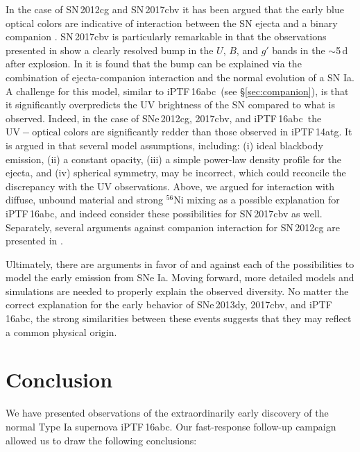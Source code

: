 \documentclass[twocolumn]{aastex61}
\newcommand{\abc}{iPTF\,16abc}
\begin{document}
In the case of SN\,2012cg and SN\,2017cbv it has been argued that the early
blue optical colors are indicative of interaction between the SN ejecta and a
binary companion \citep{2016ApJ...820...92M,2017ApJ...845L..11H}. SN\,2017cbv
is particularly remarkable in that the observations presented in
\citet{2017ApJ...845L..11H} show a clearly resolved bump in the $U$, $B$, and
$g'$ bands in the $\sim$5\,d after explosion. In
\citeauthor{2017ApJ...845L..11H} it is found that the bump can be explained
via the combination of ejecta-companion interaction and the normal evolution
of a SN Ia. A challenge for this model, similar to \abc\ (see
\S\ref{sec:companion}), is that it significantly overpredicts the UV
brightness of the SN compared to what is observed. Indeed, in the case of
SNe\,2012cg, 2017cbv, and \abc\ the $\mathrm{UV} - \mathrm{optical}$ colors
are significantly redder than those observed in iPTF\,14atg. It is argued in
\citet{2017ApJ...845L..11H} that several model assumptions, including: (i)
ideal blackbody emission, (ii) a constant opacity, (iii) a simple power-law
density profile for the ejecta, and (iv) spherical symmetry, may be incorrect,
which could reconcile the discrepancy with the UV observations. Above, we
argued for interaction with diffuse, unbound material and strong
$^{56}$Ni mixing as a possible explanation for \abc, and indeed
\citet{2017ApJ...845L..11H} consider these possibilities for SN\,2017cbv as
well. Separately, several arguments against companion interaction for
SN\,2012cg are presented in \citet{2016arXiv161007601S}.

Ultimately, there are arguments in favor of and against each of the
possibilities to model the early emission from SNe Ia. Moving
forward, more detailed models and simulations are needed to properly explain
the observed diversity. No matter the correct explanation for the early
behavior of SNe\,2013dy, 2017cbv, and \abc, the strong similarities between
these events suggests that they may reflect a common physical origin.

\section{Conclusion}
\label{sec:conclusion}

We have presented observations of the extraordinarily early discovery of the 
normal Type Ia supernova \abc. Our fast-response follow-up 
campaign allowed us to draw the following conclusions:
\end{document}
